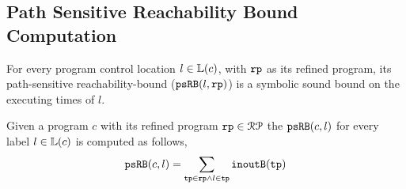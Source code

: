 \subsection{Path Sensitive Reachability Bound Computation}

For every program control location $l \in \mathbb{L}(c)$, with $\mathtt{rp}$ as its refined program,
its path-sensitive reachability-bound ($\mathtt{psRB}(l, \mathtt{rp})$) is a symbolic sound bound on the executing times of $l$.
 \begin{defn}
  \label{def:label_psrb}
Given a program $c$ with its refined program $\mathtt{rp} \in \mathcal{RP}$
the $\mathtt{psRB}(c, l)$ for every label $l \in \mathbb{L}(c)$ is computed as follows,
\\
\[ \mathtt{psRB}(c, l) = \sum\limits_{\mathtt{tp} \in \mathtt{rp} \land 
l \in \mathtt{tp}} \mathtt{inoutB}(\mathtt{tp})\]
 \end{defn}
